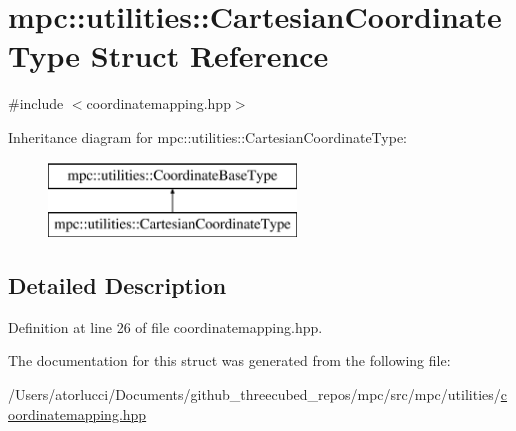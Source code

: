 \hypertarget{structmpc_1_1utilities_1_1_cartesian_coordinate_type}{}\section{mpc\+:\+:utilities\+:\+:Cartesian\+Coordinate\+Type Struct Reference}
\label{structmpc_1_1utilities_1_1_cartesian_coordinate_type}


{\ttfamily \#include $<$coordinatemapping.\+hpp$>$}

Inheritance diagram for mpc\+:\+:utilities\+:\+:Cartesian\+Coordinate\+Type\+:\begin{figure}[H]
\begin{center}
\leavevmode
\includegraphics[height=2.000000cm]{structmpc_1_1utilities_1_1_cartesian_coordinate_type}
\end{center}
\end{figure}


\subsection{Detailed Description}


Definition at line 26 of file coordinatemapping.\+hpp.



The documentation for this struct was generated from the following file\+:\begin{DoxyCompactItemize}
\item 
/\+Users/atorlucci/\+Documents/github\+\_\+threecubed\+\_\+repos/mpc/src/mpc/utilities/\mbox{\hyperlink{coordinatemapping_8hpp}{coordinatemapping.\+hpp}}\end{DoxyCompactItemize}

